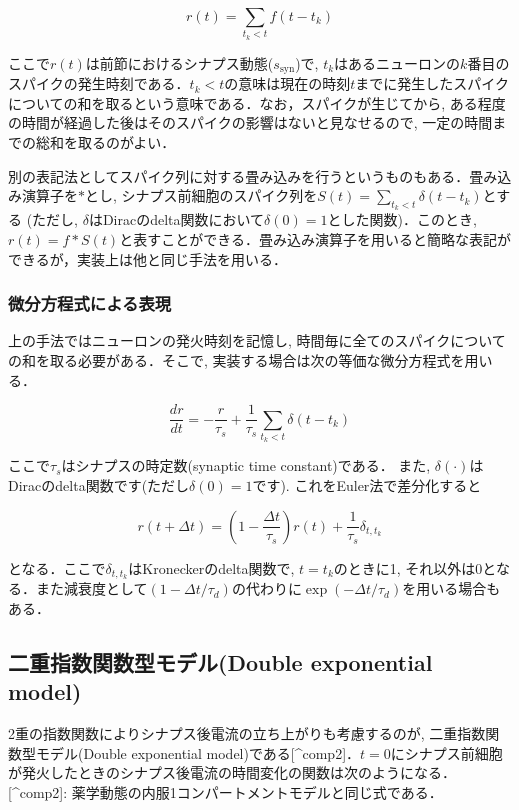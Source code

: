 \begin{equation}
r(t)=\sum_{t_{k}< t} f\left(t-t_{k}\right)
\end{equation}


ここで${r(t)}$は前節におけるシナプス動態($s_{\text{syn}}$)で, $t_{k}$はあるニューロンの$k$番目のスパイクの発生時刻である．${t_{k}<t}$の意味は現在の時刻$t$までに発生したスパイクについての和を取るという意味である．なお，スパイクが生じてから, ある程度の時間が経過した後はそのスパイクの影響はないと見なせるので, 一定の時間までの総和を取るのがよい．

別の表記法としてスパイク列に対する畳み込みを行うというものもある．畳み込み演算子を$*$とし, シナプス前細胞のスパイク列を$S(t)=\sum_{t_{k}< t} \delta\left(t-t_{k}\right)$とする (ただし, $\delta$はDiracのdelta関数において$\delta(0)=1$とした関数)．このとき, $r(t)=f*S(t)$と表すことができる．畳み込み演算子を用いると簡略な表記ができるが，実装上は他と同じ手法を用いる．

\subsubsection{微分方程式による表現}
上の手法ではニューロンの発火時刻を記憶し, 時間毎に全てのスパイクについての和を取る必要がある．そこで, 実装する場合は次の等価な微分方程式を用いる．


\begin{equation}
\frac{dr}{dt}=-\frac{r}{\tau_{s}}+\frac{1}{\tau_{s}} \sum_{t_{k}< t} \delta\left(t-t_{k}\right)   
\end{equation}


ここで$\tau_s$はシナプスの時定数(synaptic time constant)である． また, $\delta(\cdot)$はDiracのdelta関数です(ただし$\delta(0)=1$です). これをEuler法で差分化すると 


\begin{equation}
r(t+\Delta t)=\left(1-\frac{\Delta t}{\tau_{s}}\right)r(t)+\frac{1}{\tau_{s}}\delta_{t,t_{k}} 
\end{equation}


となる．ここで$\delta_{t,t_{k}}$はKroneckerのdelta関数で, $t=t_{k}$のときに1, それ以外は0となる．また減衰度として$\left(1-\Delta  t/\tau_{d}\right)$の代わりに$\exp\left(-\Delta t/\tau_{d}\right)$を用いる場合もある．
\subsection{二重指数関数型モデル(Double exponential model)}
2重の指数関数によりシナプス後電流の立ち上がりも考慮するのが, 二重指数関数型モデル(Double exponential model)である[^comp2]．$t=0$にシナプス前細胞が発火したときのシナプス後電流の時間変化の関数は次のようになる．
[^comp2]: 薬学動態の内服1コンパートメントモデルと同じ式である．


